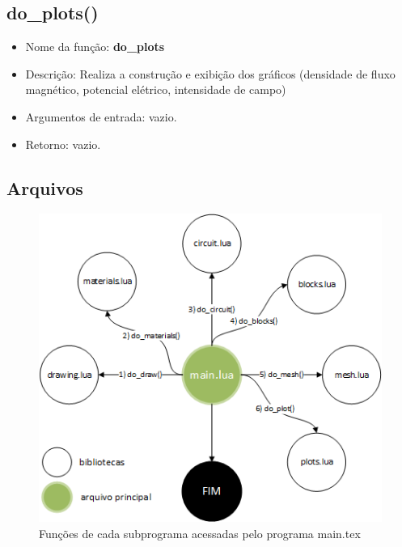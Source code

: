 \subsection*{do\_plots()}
\begin{itemize}
  \item Nome da função: \textbf{do\_plots}
  \item Descrição: Realiza a construção e exibição dos gráficos (densidade de fluxo magnético, potencial elétrico, intensidade de campo)
  \item Argumentos de entrada: vazio.
  \item Retorno: vazio.
\end{itemize}

\subsection{Arquivos}
\begin{figure}[H]
\centering
\includegraphics[scale=1]{img/assig3/main_program_subprograms.png}
\caption[Resultados]{Funções de cada subprograma acessadas pelo programa main.tex}
\label{lua_mesh}
\end{figure}

